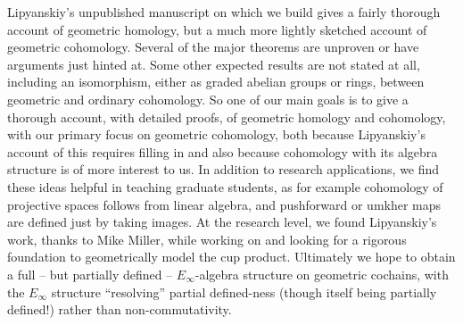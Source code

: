 Lipyanskiy's unpublished manuscript \cite{Lipy14} on which we build gives a fairly thorough account of geometric homology, but a much more lightly sketched account of geometric cohomology.
Several of the major theorems are unproven or have arguments just hinted at.
Some other expected results are not stated at all, including an isomorphism, either as graded abelian groups or rings, between geometric and ordinary cohomology.
So one of our main goals is to give a thorough account, with detailed proofs, of geometric homology and cohomology, with our primary focus on geometric cohomology, both because Lipyanskiy's account of this requires filling in and also because cohomology with its algebra structure is of more interest to us.
In addition to research applications, we find these ideas helpful in teaching graduate students, as for example cohomology of projective spaces follows from linear algebra, and pushforward or umkher maps are defined just by taking images.
At the research level, we found Lipyanskiy's work, thanks to Mike Miller, while working on \cite{FMS-flows} and looking for a rigorous foundation to geometrically model the cup product.
Ultimately we hope to obtain a full -- but partially defined -- $E_\infty$-algebra structure on geometric cochains, with the $E_\infty$ structure ``resolving'' partial defined-ness (though itself being partially defined!) rather than non-commutativity.


